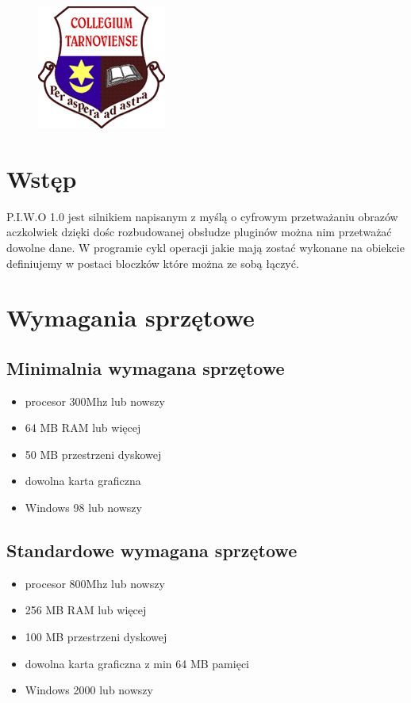 \documentclass[a4paper,10pt]{article}
\title{\textbf{\begin{LARGE}P.I.W.O. 1.0\end{LARGE}}\\\underline{Projekt Informatyczny} \\ Wilqu \& Others \\\textbf{Instrukcja użytkownika}}
\author{Piotr Wilk \and Piotr Zegar \and Mateusz Tylek \and Mateusz Kocąb \and Wojciech Zbiegieł \and Sławomir Librant \and  Marek Prząda}
\begin{document}
\maketitle
\begin{figure}[h]
 \centering
\includegraphics{logo}
\begin{center}
\begin{center}

\end{center}

\end{center}

\end{figure}
\newpage
\tableofcontents
\newpage

\section{Wstęp}
P.I.W.O 1.0 jest silnikiem napisanym z myślą o cyfrowym przetważaniu obrazów aczkolwiek dzięki dośc rozbudowanej obsłudze pluginów można nim przetważać dowolne dane. W programie cykl operacji jakie mają zostać wykonane na obiekcie definiujemy w postaci bloczków które można ze sobą łączyć.
\section{Wymagania sprzętowe}
\subsection{Minimalnia wymagana sprzętowe}
\begin{itemize}
 \item procesor 300Mhz lub nowszy
 \item 64 MB RAM lub więcej
 \item 50 MB przestrzeni dyskowej
 \item dowolna karta graficzna
 \item Windows 98 lub nowszy 
\end{itemize}
\subsection{Standardowe wymagana sprzętowe}
\begin{itemize}
 \item procesor 800Mhz lub nowszy
 \item 256 MB RAM lub więcej
 \item 100 MB przestrzeni dyskowej
 \item dowolna karta graficzna z min 64 MB pamięci
 \item Windows 2000 lub nowszy 
\end{itemize}
\end{document}

